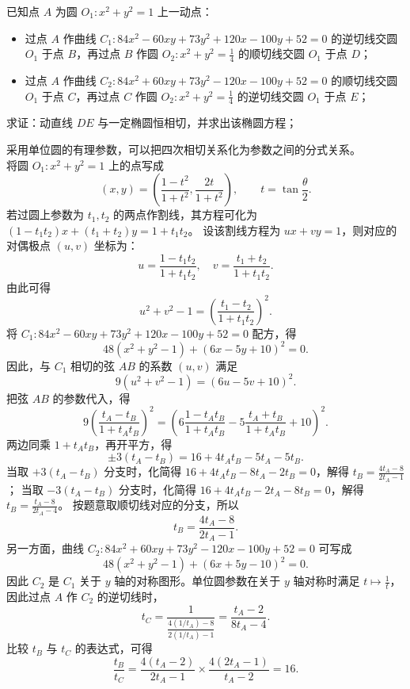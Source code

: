 \begin{example}
已知点 \(A\) 为圆 \(O_1: x^2 + y^2 = 1\) 上一动点：
\begin{itemize}
\item 过点 \(A\) 作曲线 \(C_1: 84x^2 - 60xy + 73y^2 + 120x - 100y + 52 = 0\) 的逆切线交圆 \(O_1\) 于点 \(B\)，再过点 \(B\) 作圆 \(O_2: x^2 + y^2 = \frac{1}{4}\) 的顺切线交圆 \(O_1\) 于点 \(D\)；
\item 过点 \(A\) 作曲线 \(C_2: 84x^2 + 60xy + 73y^2 - 120x - 100y + 52 = 0\) 的顺切线交圆 \(O_1\) 于点 \(C\)，再过点 \(C\) 作圆 \(O_2: x^2 + y^2 = \frac{1}{4}\) 的逆切线交圆 \(O_1\) 于点 \(E\)；
\end{itemize}
求证：动直线 \(DE\) 与一定椭圆恒相切，并求出该椭圆方程；
\end{example}
\begin{solution}
采用单位圆的有理参数，可以把四次相切关系化为参数之间的分式关系。\\
将圆 $O_1: x^2 + y^2 = 1$ 上的点写成
\[
(x, y) = \left( \frac{1-t^2}{1+t^2}, \frac{2t}{1+t^2} \right), \qquad t = \tan\frac{\theta}{2}.
\]
若过圆上参数为 $t_1, t_2$ 的两点作割线，其方程可化为 $(1 - t_1 t_2)x + (t_1 + t_2)y = 1 + t_1 t_2$。
设该割线方程为 $ux + vy = 1$，则对应的对偶极点 $(u, v)$ 坐标为：
\[ u = \frac{1-t_1 t_2}{1+t_1 t_2}, \quad v = \frac{t_1 + t_2}{1+t_1 t_2}. \]
由此可得
\[ u^2 + v^2 - 1 = \left( \frac{t_1 - t_2}{1 + t_1 t_2} \right)^2. \]
将 $C_1: 84x^2 - 60xy + 73y^2 + 120x - 100y + 52 = 0$ 配方，得
\[ 48(x^2 + y^2 - 1) + (6x - 5y + 10)^2 = 0. \]
因此，与 $C_1$ 相切的弦 $AB$ 的系数 $(u, v)$ 满足
\[ 9(u^2 + v^2 - 1) = (6u - 5v + 10)^2. \]
把弦 $AB$ 的参数代入，得
\[ 9\left( \frac{t_A - t_B}{1 + t_A t_B} \right)^2 = \left( 6\frac{1 - t_A t_B}{1 + t_A t_B} - 5\frac{t_A + t_B}{1 + t_A t_B} + 10 \right)^2. \]
两边同乘 $1+t_A t_B$，再开平方，得
\[ \pm 3(t_A - t_B) = 16 + 4t_A t_B - 5t_A - 5t_B. \]
当取 $+3(t_A - t_B)$ 分支时，化简得 $16 + 4t_A t_B - 8t_A - 2t_B = 0$，解得 $t_B = \frac{4t_A - 8}{2t_A - 1}$；
当取 $-3(t_A - t_B)$ 分支时，化简得 $16 + 4t_A t_B - 2t_A - 8t_B = 0$，解得 $t_B = \frac{t_A - 8}{2t_A - 4}$。
按题意取顺切线对应的分支，所以
\[ t_B = \frac{4t_A - 8}{2t_A - 1}. \]
另一方面，曲线 $C_2: 84x^2 + 60xy + 73y^2 - 120x - 100y + 52 = 0$ 可写成
\[ 48(x^2 + y^2 - 1) + (6x + 5y - 10)^2 = 0. \]
因此 $C_2$ 是 $C_1$ 关于 $y$ 轴的对称图形。单位圆参数在关于 $y$ 轴对称时满足 $t \mapsto \frac{1}{t}$，因此过点 $A$ 作 $C_2$ 的逆切线时，
\[ t_C = \frac{1}{\frac{4(1/t_A) - 8}{2(1/t_A) - 1}} = \frac{t_A - 2}{8t_A - 4}. \]
比较 $t_B$ 与 $t_C$ 的表达式，可得
\[ \frac{t_B}{t_C} = \frac{4(t_A - 2)}{2t_A - 1} \times \frac{4(2t_A - 1)}{t_A - 2} = 16. \]

\end{solution}
